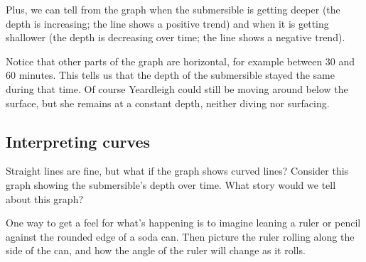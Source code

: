 Plus, we can tell from the graph when the submersible is getting deeper (the depth is increasing; the line shows a positive trend) and when it is getting shallower (the depth is decreasing over time; the line shows a negative trend).

Notice that other parts of the graph are horizontal, for example between 30 and 60 minutes. This tells us that the depth of the submersible stayed the same during that time. Of course Yeardleigh could still be moving around below the surface, but she remains at a constant depth, neither diving nor surfacing.

\subsection{Interpreting curves}

Straight lines are fine, but what if the graph shows curved lines? Consider this graph showing the submersible's depth over time. What story would we tell about this graph?


\begin{figure}
\end{figure}

One way to get a feel for what's happening is to imagine leaning a ruler or pencil against the rounded edge of a soda can. Then picture the ruler rolling along the side of the can, and how the angle of the ruler will change as it rolls.

